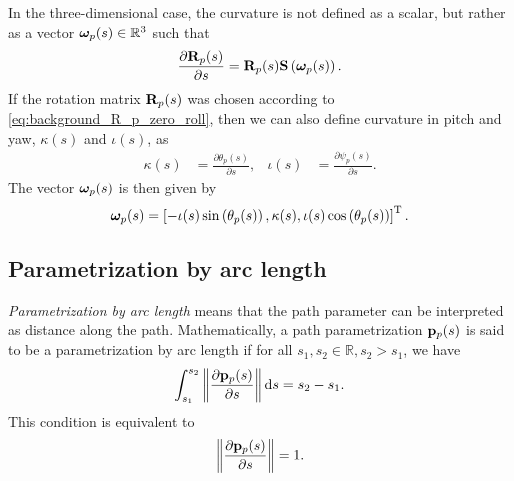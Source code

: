 In the three-dimensional case, the curvature is not defined as a scalar, but rather as a vector $\bm{\omega}_p(s) \in \mathbb{R}^3$ such that
\begin{equation}
    \frac{\partial \mathbf{R}_p(s)}{\partial s} = \mathbf{R}_p(s) \mathbf{S}\left(\bm{\omega}_p(s)\right).
\end{equation}
If the rotation matrix $\mathbf{R}_p(s)$ was chosen according to \eqref{eq:background_R_p_zero_roll}, then we can also define curvature in pitch and yaw, $\kappa(s)$ and $\iota(s)$, as
\begin{align}
    \kappa(s) &= \frac{\partial \theta_{p}(s)}{\partial s}, &
    \iota(s) &= \frac{\partial \psi_{p}(s)}{\partial s}.
\end{align}
The vector $\bm{\omega}_p(s)$ is then given by
\begin{equation}
    \bm{\omega}_p(s) = \left[-\iota(s)\sin\left(\theta_{p}(s)\right), \kappa(s), \iota(s)\cos\left(\theta_{p}(s)\right)\right]^{\mathrm{T}}.
\end{equation}

\subsection*{Parametrization by arc length}
\emph{Parametrization by arc length} means that the path parameter can be interpreted as distance along the path.
Mathematically, a path parametrization $\mathbf{p}_p(s)$ is said to be a parametrization by arc length if for all $s_1, s_2 \in \mathbb{R}, s_2 > s_1$, we have
\begin{equation}
    \int_{s_1}^{s_2} \left\|\frac{\partial \mathbf{p}_p(s)}{\partial s}\right\| {\rm d}s = s_2 - s_1.
\end{equation}
This condition is equivalent to
\begin{equation}
    \left\|\frac{\partial \mathbf{p}_p(s)}{\partial s}\right\| = 1.
\end{equation}



